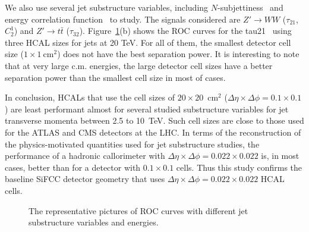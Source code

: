 \documentclass[a4paper]{PoS}
\begin{document}
We also use several jet substructure variables, including $N$-subjettiness~\cite{Thaler:2010tr} and energy correlation function~\cite{Larkoski:2013eya} to study. The signals considered are $Z'\rightarrow WW$ ($\tau_{21}$,$C_2^1$) and $Z' \rightarrow t\bar{t}$ ($\tau_{32}$). Figure~\ref{1}(b) shows the ROC curves for the tau21~\cite{Thaler:2010tr} using three HCAL sizes for jets at 20 TeV. For all of them, the smallest detector cell size ($1\times1~\mathrm{cm}^2$) does not have the best separation power. It is interesting to note that at very large c.m. energies, the large detector cell sizes have a better separation power than the smallest cell size in most of cases. 

In conclusion, HCALs that use the cell sizes of $20\times 20$~cm$^2$ ($\Delta \eta \times \Delta \phi = 0.1\times0.1$) 
are least performant almost for several studied 
substructure variables for jet transverse momenta between 2.5 to 10~TeV. 
Such cell sizes are close to 
those used for the ATLAS and CMS detectors at the LHC. 
In terms of the reconstruction of the physics-motivated quantities  
used for jet substructure studies, the  performance 
of a  hadronic callorimeter  with 
$\Delta \eta \times \Delta \phi = 0.022\times0.022$ is, in most cases,
better than for a detector with  $0.1\times0.1$ cells.
Thus this study confirms the  baseline SiFCC detector geometry \cite{Chekanov:2016ppq}
that uses $\Delta \eta \times \Delta \phi = 0.022\times0.022$ HCAL cells.


\begin{figure}
\begin{center}
\end{center}
\caption{The representative pictures of ROC curves with different jet substructure variables and energies.}
\label{1}
\end{figure}
\end{document}
